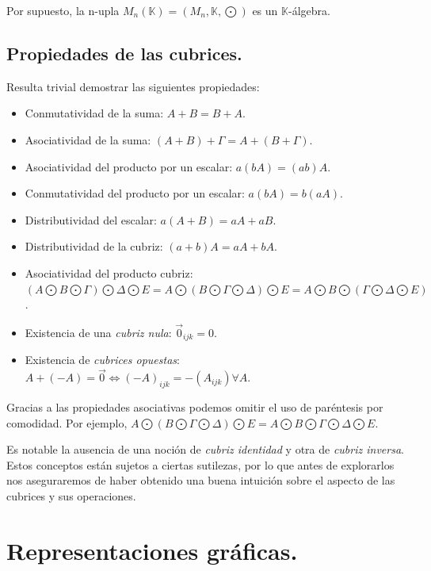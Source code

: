 \documentclass[a4paper, titlepage]{article}
\begin{document}
Por supuesto, la n-upla $M_n (\mathbb{K}) = (M_n, \mathbb{K}, \bigodot)$ es un $\mathbb{K}$-álgebra.

\subsection{Propiedades de las cubrices.}

Resulta trivial demostrar las siguientes propiedades:

\begin{itemize}
	\item Conmutatividad de la suma: $A + B = B + A$.
	\item Asociatividad de la suma: $(A + B) + \Gamma = A + (B + \Gamma)$.
	\item Asociatividad del producto por un escalar: $a(bA) = (ab)A$.
	\item Conmutatividad del producto por un escalar: $a(bA) = b(aA)$.
	\item Distributividad del escalar: $a(A + B) = aA + aB$.
	\item Distributividad de la cubriz: $(a + b)A = aA + bA$.
	\item Asociatividad del producto cubriz: $(A \bigodot B \bigodot \Gamma) \bigodot \Delta \bigodot E = A \bigodot (B \bigodot \Gamma \bigodot \Delta) \bigodot E = A \bigodot B \bigodot (\Gamma \bigodot \Delta \bigodot E)$.
	\item Existencia de una \textit{cubriz nula}: $\vec{0}_{ijk} = 0$.
	\item Existencia de \textit{cubrices opuestas}: $A + (-A) = \vec{0} \Leftrightarrow (-A)_{ijk} = -(A_{ijk}) \forall A$.
\end{itemize}

Gracias a las propiedades asociativas podemos omitir el uso de paréntesis por comodidad. Por ejemplo, $A \bigodot (B \bigodot \Gamma \bigodot \Delta) \bigodot E = A \bigodot B \bigodot \Gamma \bigodot \Delta \bigodot E$.

Es notable la ausencia de una noción de \textit{cubriz identidad} y otra de \textit{cubriz inversa}. Estos conceptos están sujetos a ciertas sutilezas, por lo que antes de explorarlos nos aseguraremos de haber obtenido una buena intuición sobre el aspecto de las cubrices y sus operaciones.

\section{Representaciones gráficas.}
\end{document}
